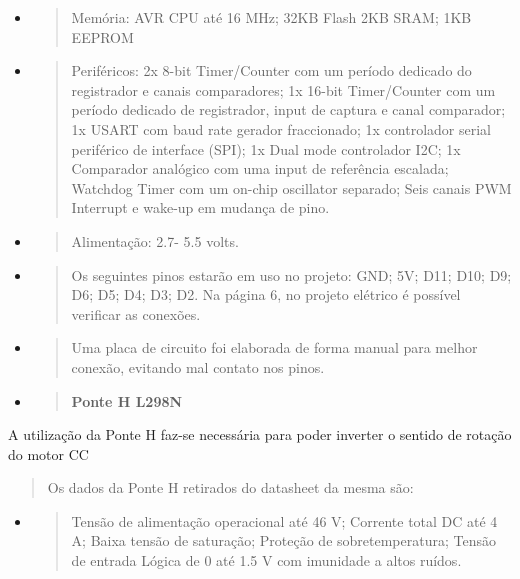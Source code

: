 \documentclass[]{article}
\begin{document}
\begin{itemize}
\item
  \begin{quote}
  Memória: AVR CPU até 16 MHz; 32KB Flash 2KB SRAM; 1KB EEPROM
  \end{quote}
\item
  \begin{quote}
  Periféricos: 2x 8-bit Timer/Counter com um período dedicado do
  registrador e canais comparadores; 1x 16-bit Timer/Counter com um
  período dedicado de registrador, input de captura e canal comparador;
  1x USART com baud rate gerador fraccionado; 1x controlador serial
  periférico de interface (SPI); 1x Dual mode controlador I2C; 1x
  Comparador analógico com uma input de referência escalada; Watchdog
  Timer com um on-chip oscillator separado; Seis canais PWM Interrupt e
  wake-up em mudança de pino.
  \end{quote}
\item
  \begin{quote}
  Alimentação: 2.7- 5.5 volts.
  \end{quote}
\item
  \begin{quote}
  Os seguintes pinos estarão em uso no projeto: GND; 5V; D11; D10; D9;
  D6; D5; D4; D3; D2. Na página 6, no projeto elétrico é possível
  verificar as conexões.
  \end{quote}
\item
  \begin{quote}
  Uma placa de circuito foi elaborada de forma manual para melhor
  conexão, evitando mal contato nos pinos.
  \end{quote}
\end{itemize}

\begin{itemize}
\item
  \begin{quote}
  \textbf{Ponte H L298N}
  \end{quote}
\end{itemize}

A utilização da Ponte H faz-se necessária para poder inverter o sentido
de rotação do motor CC

\begin{quote}
Os dados da Ponte H retirados do datasheet da mesma são:
\end{quote}

\begin{itemize}
\item
  \begin{quote}
  Tensão de alimentação operacional até 46 V; Corrente total DC até 4 A;
  Baixa tensão de saturação; Proteção de sobretemperatura; Tensão de
  entrada Lógica de 0 até 1.5 V com imunidade a altos ruídos.
  \end{quote}
\end{itemize}
\end{document}
